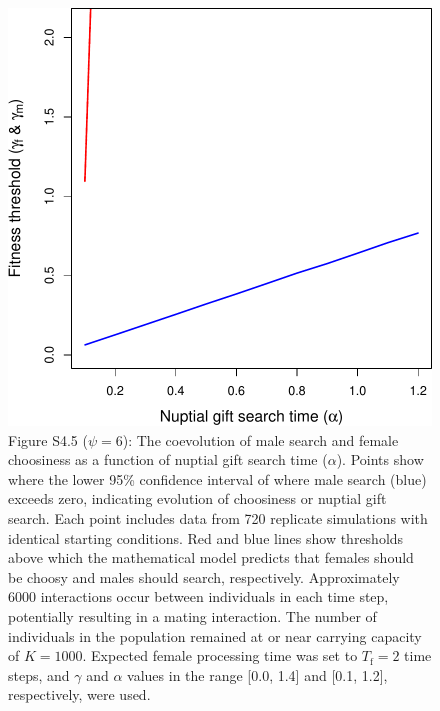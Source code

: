 \documentclass[
]{article}
\begin{document}
\captionsetup{labelformat=empty}

\begin{figure}
\centering
\includegraphics{ms_refs_fixed_files/figure-latex/unnamed-chunk-12-1.pdf}
\caption{Figure S4.5 (\(\psi = 6\)): The coevolution of male search and
female choosiness as a function of nuptial gift search time
(\(\alpha\)). Points show where the lower 95\% confidence interval of
where male search (blue) exceeds zero, indicating evolution of
choosiness or nuptial gift search. Each point includes data from 720
replicate simulations with identical starting conditions. Red and blue
lines show thresholds above which the mathematical model predicts that
females should be choosy and males should search, respectively.
Approximately 6000 interactions occur between individuals in each time
step, potentially resulting in a mating interaction. The number of
individuals in the population remained at or near carrying capacity of
\(K = 1000\). Expected female processing time was set to
\(T_{\mathrm{f}}=2\) time steps, and \(\gamma\) and \(\alpha\) values in
the range {[}0.0, 1.4{]} and {[}0.1, 1.2{]}, respectively, were used.}
\end{figure}

\captionsetup{labelformat=default}

\clearpage

\captionsetup{labelformat=empty}
\end{document}
